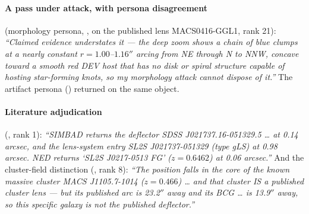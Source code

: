 \documentclass[11pt,letterpaper]{article}
\begin{document}
\paragraph{A pass under attack, with persona disagreement}
(morphology persona,  ,
on the published lens MACS0416-GGL1, rank 21): \emph{``Claimed evidence understates
it --- the deep zoom shows a chain of blue clumps at a nearly constant
$r=1.00$--$1.16''$ arcing from NE through N to NNW, concave toward a smooth
red DEV host that has no disk or spiral structure capable of hosting
star-forming knots, so my morphology attack cannot dispose of it.''} The
artifact persona () returned
 on the same object.

\paragraph{Literature adjudication}
(, rank 1): \emph{``SIMBAD
returns the deflector SDSS J021737.16-051329.5 \ldots{} at 0.14 arcsec, and
the lens-system entry SL2S J021737-051329 (type gLS) at 0.98 arcsec. NED
returns `SL2S J0217-0513 FG' ($z=0.6462$) at 0.06 arcsec.''} And the
cluster-field distinction (, rank 8):
\emph{``The position falls in the core of the known massive cluster MACS
J1105.7-1014 ($z=0.466$) \ldots{} and that cluster IS a published cluster
lens --- but its published arc is 23.2$''$ away and its BCG \ldots{} is
13.9$''$ away, so this specific galaxy is not the published deflector.''}



\end{document}
